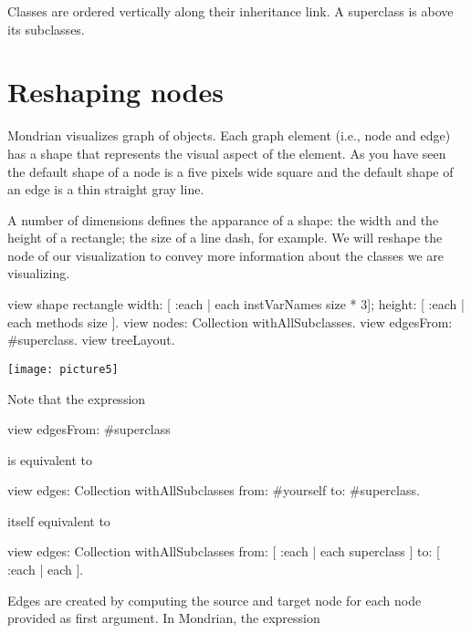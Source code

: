 \documentclass[a4paper,10pt,twoside]{book}
\begin{document}
Classes are ordered vertically along their inheritance link. A superclass is above its subclasses. 

\section{Reshaping nodes}

Mondrian visualizes graph of objects. Each graph element (i.e., node and edge) has a shape that represents the visual aspect of the element. As you have seen the default shape of a node is a five pixels wide square and the default shape of an edge is a thin straight gray line.

A number of dimensions defines the apparance of a shape: the width and the height of a rectangle; the size of a line dash, for example. We will reshape the node of our visualization to convey more information about the classes we are visualizing.

\begin{code}{}
view shape rectangle
  width: [ :each | each instVarNames size * 3];
  height: [ :each | each methods size ].
view nodes: Collection withAllSubclasses.
view edgesFrom: #superclass.
view treeLayout.
\end{code}
\begin{center}\texttt{[image: picture5]}\end{center}


Note that the expression 
\begin{code}{}
view edgesFrom: #superclass
\end{code}

is equivalent to

\begin{code}{}
view edges: Collection withAllSubclasses from: #yourself to: #superclass.
\end{code}

itself equivalent to
\begin{code}{}
view 
  edges: Collection withAllSubclasses 
  from: [ :each | each superclass ] 
  to: [ :each | each  ].
\end{code}

Edges are created by computing the source and target node for each node provided as first argument.  In Mondrian, the expression 
\end{document}
